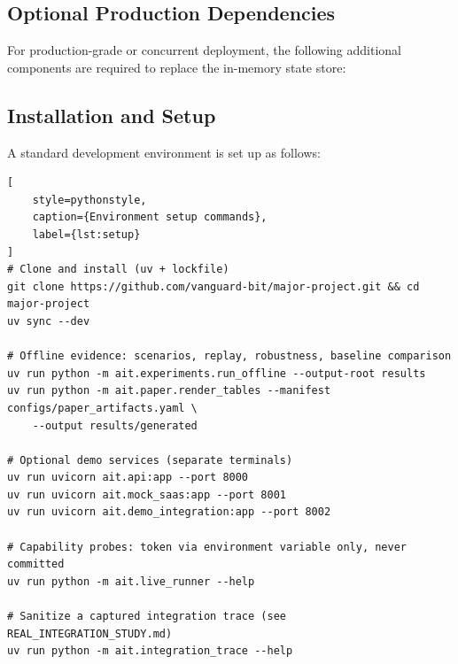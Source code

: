 \documentclass[12pt,a4paper]{report}
\begin{document}
\subsection{Optional Production Dependencies}

For production-grade or concurrent deployment, the following additional components are required
to replace the in-memory state store:

\begin{table}[H]
    \centering
    \caption{Optional Production Dependencies}
    \label{tab:prod-deps}
\end{table}

\subsection{Installation and Setup}

A standard development environment is set up as follows:

\begin{lstlisting}[
    style=pythonstyle,
    caption={Environment setup commands},
    label={lst:setup}
]
# Clone and install (uv + lockfile)
git clone https://github.com/vanguard-bit/major-project.git && cd major-project
uv sync --dev

# Offline evidence: scenarios, replay, robustness, baseline comparison
uv run python -m ait.experiments.run_offline --output-root results
uv run python -m ait.paper.render_tables --manifest configs/paper_artifacts.yaml \
    --output results/generated

# Optional demo services (separate terminals)
uv run uvicorn ait.api:app --port 8000
uv run uvicorn ait.mock_saas:app --port 8001
uv run uvicorn ait.demo_integration:app --port 8002

# Capability probes: token via environment variable only, never committed
uv run python -m ait.live_runner --help

# Sanitize a captured integration trace (see REAL_INTEGRATION_STUDY.md)
uv run python -m ait.integration_trace --help
\end{lstlisting}
\end{document}

